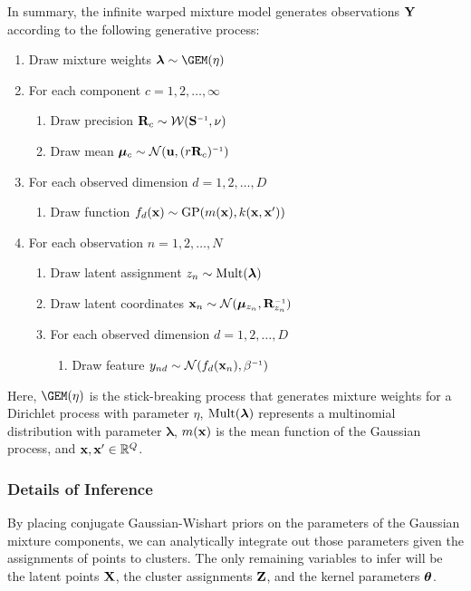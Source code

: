 In summary, the infinite warped mixture model generates observations $\mathbf{Y}$ according to the following generative process:
%
\begin{enumerate}
\item Draw mixture weights $\bm{\lambda} \sim \GEM(\eta)$
\item For each component $c=1, 2, \dots, \infty$
\begin{enumerate}
\item Draw precision $\vR_c \sim {\mathcal W}(\vS\inv, \nu)$
\item Draw mean $\vmu_c \sim {\mathcal N}(\vu,(r\vR_c)\inv)$
\end{enumerate}
\item For each observed dimension $d=1, 2, \dots, D$
\begin{enumerate}
\item Draw function $f_{d}({\bf{x}}) \sim {\rm GP}(m({\bf{x}}),k({\bf{x}},{\bf{x}}'))$
\end{enumerate}
\item For each observation $n=1, 2, \dots,N$
\begin{enumerate}
\item Draw latent assignment $z_n \sim {\rm Mult}(\bm{\lambda})$
\item Draw latent coordinates $\vx_n \sim {\mathcal N}(\vmu_{z_n},\vR_{z_n}\inv)$
\item For each observed dimension $d=1, 2, \dots, D$
\begin{enumerate}
\item Draw feature $y_{nd} \sim {\cal N}(f_d(\vx_n), \beta\inv)$
\end{enumerate}
\end{enumerate}
\end{enumerate}
%
Here, $\GEM(\eta)$ is the stick-breaking process \citep{sethuraman94} that generates mixture weights for a Dirichlet process with parameter $\eta$, %
${\rm Mult}(\bm{\lambda})$ represents a multinomial distribution with parameter $\bm{\lambda}$,
$m({\bf{x}})$ is the mean function of the Gaussian process, and ${\bf{x}},{\bf{x}}'\in{\mathbb R}^{Q}$.



\subsubsection{Details of Inference}
\label{sec:iwmm-inference-details}

By placing conjugate Gaussian-Wishart priors on the parameters of the Gaussian mixture components, we can analytically integrate out those parameters given the assignments of points to clusters.
The only remaining variables to infer will be the latent points $\mathbf{X}$, the cluster assignments $\mathbf{Z}$, and the kernel parameters ${\boldsymbol{\theta}}$.

